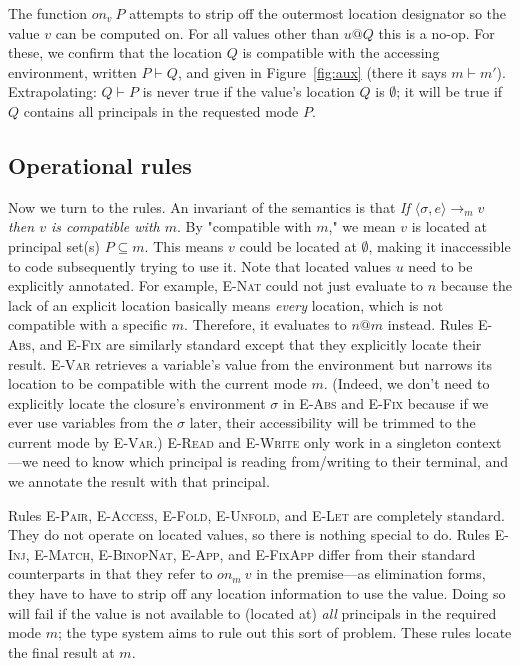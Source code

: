 \documentclass[10pt]{article}
\makeatletter
\newcommand{\rulelab}[1]{{\small \textsc{#1}}}
\newcommand{\kw}[1]{\ensuremath{\mathtt{#1}}}
\newcommand{\vloc}[2]{\ensuremath{{#1}\kw{@}{#2}}}
\newcommand{\eval}[4]{\ensuremath{\config{#1}{#3} \longrightarrow_{#2} {#4}}}
\newcommand{\env}{\ensuremath{\sigma}}
\newcommand{\config}[2]{\ensuremath{\langle{#1},{#2}\rangle}}
\newcommand{\getat}[2]{\ensuremath{\mathit{on}_{#1}~{#2}}}
\makeatother
\begin{document}
The function $\getat{v}{P}$ attempts to strip off the outermost
location designator so the value $v$ can be computed on. For all
values other than $\vloc{u}{Q}$ this is a no-op. For these, we confirm
that the location $Q$ is compatible with the accessing environment,
written $P \vdash Q$, and given in Figure~\ref{fig:aux} (there it says
$m \vdash m'$). Extrapolating: $Q \vdash P$ is never true if the value's
location $Q$ is $\emptyset$; it will be true if $Q$ contains all
principals in the requested mode $P$.

\subsection{Operational rules}

Now we turn to the rules. An invariant of the semantics is that
\emph{If $\eval{\env}{m}{e}{v}$ then $v$ is compatible with $m$}. By
"compatible with $m$," we mean $v$ is located at principal set(s)
$P \subseteq m$. This means $v$ could be located at $\emptyset$,
making it inaccessible to code subsequently trying to use it. Note
that located values $u$ need to be explicitly annotated. For example,
\rulelab{E-Nat} could not just evaluate to $n$ because the lack of an
explicit location basically means \emph{every} location, which is not
compatible with a specific $m$. Therefore, it evaluates to
$\vloc{n}{m}$ instead. Rules \rulelab{E-Abs}, and \rulelab{E-Fix} are
similarly standard except that they explicitly locate their
result. \rulelab{E-Var} retrieves a variable's value from the
environment but narrows its location to be compatible with the current
mode $m$. (Indeed, we don't need to explicitly locate the closure's
environment $\env$ in \rulelab{E-Abs} and \rulelab{E-Fix} because if
we ever use variables from the $\env$ later, their accessibility will
be trimmed to the current mode by \rulelab{E-Var}.) \rulelab{E-Read}
and \rulelab{E-Write} only work in a singleton context---we need to
know which principal is reading from/writing to their terminal, and we
annotate the result with that principal.

Rules \rulelab{E-Pair}, \rulelab{E-Access}, \rulelab{E-Fold},
\rulelab{E-Unfold}, and \rulelab{E-Let} are completely standard. They
do not operate on located values, so there is nothing special to do.
Rules \rulelab{E-Inj}, \rulelab{E-Match}, \rulelab{E-BinopNat},
\rulelab{E-App}, and \rulelab{E-FixApp} differ from their standard
counterparts in that they refer to $\getat{m}{v}$ in the premise---as
elimination forms, they have to have to strip off any location
information to use the value. Doing so will fail if the value is
not available to (located at) \emph{all} principals in the required
mode $m$; the type system aims to rule out this sort of problem. These
rules locate the final result at $m$.
\end{document}

